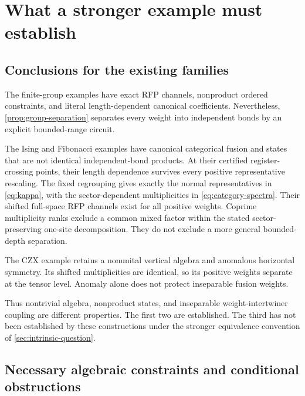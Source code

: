 \section{What a stronger example must establish}
\label{sec:intrinsic-frontier}

\subsection{Conclusions for the existing families}

The finite-group examples have exact RFP channels, nonproduct
ordered constraints, and literal length-dependent canonical
coefficients. Nevertheless, \cref{prop:group-separation} separates
every weight into independent bonds by an explicit bounded-range
circuit.

The Ising and Fibonacci examples have canonical categorical fusion
and states that are not identical independent-bond products. At their
certified register-crossing points, their length dependence survives
every positive representative rescaling. The fixed regrouping gives
exactly the normal representatives in \cref{eq:kappa}, with the
sector-dependent multiplicities in \cref{eq:category-spectra}.
Their shifted full-space RFP channels exist for all positive
weights. Coprime multiplicity ranks exclude a common mixed factor
within the stated sector-preserving one-site decomposition.
They do not exclude a more general bounded-depth separation.

The CZX example retains a nonunital vertical algebra and anomalous
horizontal symmetry. Its shifted multiplicities are identical, so
its positive weights separate at the tensor level. Anomaly alone
does not protect inseparable fusion weights.

Thus nontrivial algebra, nonproduct states, and inseparable
weight-intertwiner coupling are different properties. The first two
are established. The third has not been established by these
constructions under the stronger equivalence convention of
\cref{sec:intrinsic-question}.

\subsection{Necessary algebraic constraints and conditional obstructions}

